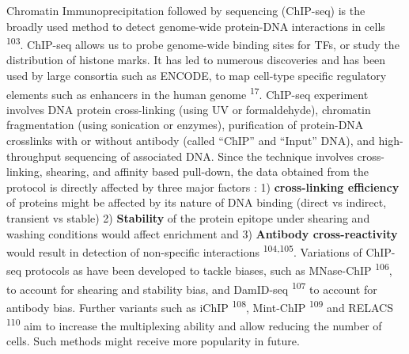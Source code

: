 \documentclass[11pt,twoside]{MPIthesis}
\theoremstyle{definition}
\theoremstyle{definition}
\theoremstyle{definition}
\theoremstyle{remark}
\begin{document}
Chromatin Immunoprecipitation followed by sequencing (ChIP-seq) is the
broadly used method to detect genome-wide protein-DNA interactions in
cells \textsuperscript{103}. ChIP-seq allows us to probe genome-wide
binding sites for TFs, or study the distribution of histone marks. It
has led to numerous discoveries and has been used by large consortia
such as ENCODE, to map cell-type specific regulatory elements such as
enhancers in the human genome \textsuperscript{17}. ChIP-seq experiment
involves DNA protein cross-linking (using UV or formaldehyde), chromatin
fragmentation (using sonication or enzymes), purification of protein-DNA
crosslinks with or without antibody (called ``ChIP'' and ``Input'' DNA),
and high-throughput sequencing of associated DNA. Since the technique
involves cross-linking, shearing, and affinity based pull-down, the data
obtained from the protocol is directly affected by three major factors :
1) \textbf{cross-linking efficiency} of proteins might be affected by
its nature of DNA binding (direct vs indirect, transient vs stable) 2)
\textbf{Stability} of the protein epitope under shearing and washing
conditions would affect enrichment and 3) \textbf{Antibody
cross-reactivity} would result in detection of non-specific interactions
\textsuperscript{104,105}. Variations of ChIP-seq protocols as have been
developed to tackle biases, such as MNase-ChIP \textsuperscript{106}, to
account for shearing and stability bias, and DamID-seq
\textsuperscript{107} to account for antibody bias. Further variants
such as iChIP \textsuperscript{108}, Mint-ChIP \textsuperscript{109} and
RELACS \textsuperscript{110} aim to increase the multiplexing ability
and allow reducing the number of cells. Such methods might receive more
popularity in future.
\end{document}
